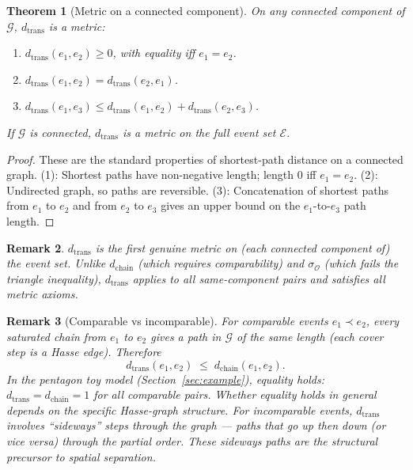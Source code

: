 \documentclass[12pt]{article}
\newtheorem{theorem}{Theorem}
\newtheorem{remark}[theorem]{Remark}
\newcommand{\Ecal}{\mathcal{E}}
\newcommand{\Ocal}{\mathcal{O}}
\newcommand{\Gcal}{\mathcal{G}}
\begin{document}
\begin{theorem}[Metric on a connected component]\label{thm:metric}
On any connected component of $\Gcal$, $d_{\mathrm{trans}}$ is a metric:
\begin{enumerate}
    \item $d_{\mathrm{trans}}(e_1, e_2) \geq 0$, with equality iff $e_1 = e_2$.
    \item $d_{\mathrm{trans}}(e_1, e_2) = d_{\mathrm{trans}}(e_2, e_1)$.
    \item $d_{\mathrm{trans}}(e_1, e_3) \leq d_{\mathrm{trans}}(e_1, e_2) + d_{\mathrm{trans}}(e_2, e_3)$.
\end{enumerate}
If $\Gcal$ is connected, $d_{\mathrm{trans}}$ is a metric on the full event set $\Ecal$.
\end{theorem}

\begin{proof}
These are the standard properties of shortest-path distance on a connected graph. (1): Shortest paths have non-negative length; length $0$ iff $e_1 = e_2$. (2): Undirected graph, so paths are reversible. (3): Concatenation of shortest paths from $e_1$ to $e_2$ and from $e_2$ to $e_3$ gives an upper bound on the $e_1$-to-$e_3$ path length.
\end{proof}

\begin{remark}
$d_{\mathrm{trans}}$ is the first genuine metric on (each connected component of) the event set. Unlike $d_{\mathrm{chain}}$ (which requires comparability) and $\sigma_{\Ocal}$ (which fails the triangle inequality), $d_{\mathrm{trans}}$ applies to all same-component pairs and satisfies all metric axioms.
\end{remark}

\begin{remark}[Comparable vs incomparable]
For comparable events $e_1 \prec e_2$, every saturated chain from $e_1$ to $e_2$ gives a path in $\Gcal$ of the same length (each cover step is a Hasse edge). Therefore
\begin{equation}
    d_{\mathrm{trans}}(e_1, e_2) \;\leq\; d_{\mathrm{chain}}(e_1, e_2).
\end{equation}
In the pentagon toy model (Section~\ref{sec:example}), equality holds: $d_{\mathrm{trans}} = d_{\mathrm{chain}} = 1$ for all comparable pairs. Whether equality holds in general depends on the specific Hasse-graph structure. For incomparable events, $d_{\mathrm{trans}}$ involves ``sideways'' steps through the graph --- paths that go up then down (or vice versa) through the partial order. These sideways paths are the structural precursor to spatial separation.
\end{remark}
\end{document}
